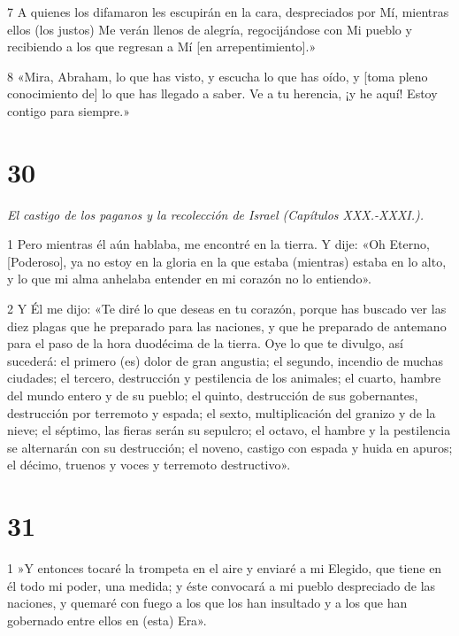 \par 7 A quienes los difamaron les escupirán en la cara, despreciados por Mí, mientras ellos (los justos) Me verán llenos de alegría, regocijándose con Mi pueblo y recibiendo a los que regresan a Mí [en arrepentimiento].»

\par 8 «Mira, Abraham, lo que has visto, y escucha lo que has oído, y [toma pleno conocimiento de] lo que has llegado a saber. Ve a tu herencia, ¡y he aquí! Estoy contigo para siempre.»

\chapter{30}

\par \textit{El castigo de los paganos y la recolección de Israel (Capítulos XXX.-XXXI.).}

\par 1 Pero mientras él aún hablaba, me encontré en la tierra. Y dije: «Oh Eterno, [Poderoso], ya no estoy en la gloria en la que estaba (mientras) estaba en lo alto, y lo que mi alma anhelaba entender en mi corazón no lo entiendo».

\par 2 Y Él me dijo: «Te diré lo que deseas en tu corazón, porque has buscado ver las diez plagas que he preparado para las naciones, y que he preparado de antemano para el paso de la hora duodécima de la tierra. Oye lo que te divulgo, así sucederá: el primero (es) dolor de gran angustia; el segundo, incendio de muchas ciudades; el tercero, destrucción y pestilencia de los animales; el cuarto, hambre del mundo entero y de su pueblo; el quinto, destrucción de sus gobernantes, destrucción por terremoto y espada; el sexto, multiplicación del granizo y de la nieve; el séptimo, las fieras serán su sepulcro; el octavo, el hambre y la pestilencia se alternarán con su destrucción; el noveno, castigo con espada y huida en apuros; el décimo, truenos y voces y terremoto destructivo».

\chapter{31}

\par 1 »Y entonces tocaré la trompeta en el aire y enviaré a mi Elegido, que tiene en él todo mi poder, una medida; y éste convocará a mi pueblo despreciado de las naciones, y quemaré con fuego a los que los han insultado y a los que han gobernado entre ellos en (esta) Era».

